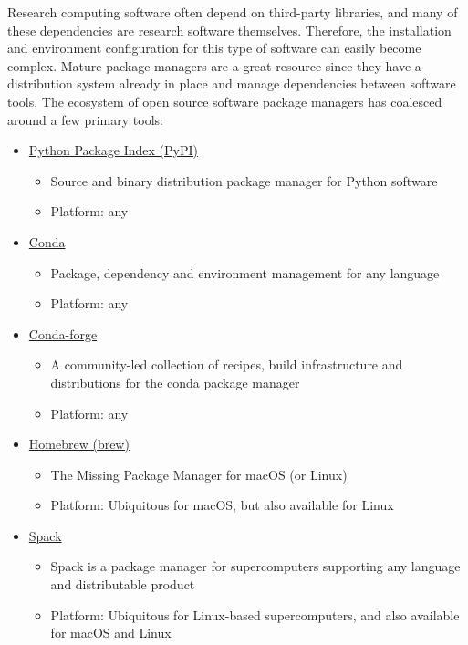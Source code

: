 \documentclass[]{nrel}
\begin{document}
Research computing software often depend on third-party libraries, and many of these dependencies
are research software themselves. Therefore, the installation and environment configuration
for this type of software can easily become complex.
Mature package managers are a great resource since they have a distribution system already in place
and manage dependencies between software tools.
The ecosystem of open source software package managers has coalesced around a few primary tools:
\begin{itemize}

\item \href{https://pypi.org}{Python Package Index (PyPI)}
\begin{itemize}
\item Source and binary distribution package manager for Python software
\item Platform: any
\end{itemize}

\item \href{https://docs.conda.io/en/latest/}{Conda}
\begin{itemize}
\item Package, dependency and environment management for any language
\item Platform: any
\end{itemize}

\item \href{https://conda-forge.org}{Conda-forge}
\begin{itemize}
\item A community-led collection of recipes, build infrastructure and distributions for the conda package manager
\item Platform: any
\end{itemize}

\item \href{https://brew.sh}{Homebrew (brew)}
\begin{itemize}
\item The Missing Package Manager for macOS (or Linux)
\item Platform: Ubiquitous for macOS, but also available for Linux
\end{itemize}

\item \href{https://spack.io}{Spack}
\begin{itemize}
\item Spack is a package manager for supercomputers supporting any language and distributable product
\item Platform: Ubiquitous for Linux-based supercomputers, and also available for macOS and Linux
\end{itemize}


\end{itemize}
\end{document}
